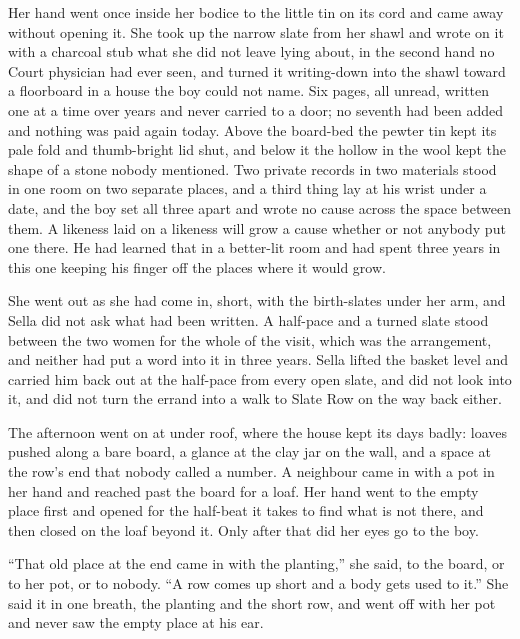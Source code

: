 Her hand went once inside her bodice to the little tin on its cord and came away without opening it. She took up the narrow slate from her shawl and wrote on it with a charcoal stub what she did not leave lying about, in the second hand no Court physician had ever seen, and turned it writing-down into the shawl toward a floorboard in a house the boy could not name. Six pages, all unread, written one at a time over years and never carried to a door; no seventh had been added and nothing was paid again today. Above the board-bed the pewter tin kept its pale fold and thumb-bright lid shut, and below it the hollow in the wool kept the shape of a stone nobody mentioned. Two private records in two materials stood in one room on two separate places, and a third thing lay at his wrist under a date, and the boy set all three apart and wrote no cause across the space between them. A likeness laid on a likeness will grow a cause whether or not anybody put one there. He had learned that in a better-lit room and had spent three years in this one keeping his finger off the places where it would grow.

She went out as she had come in, short, with the birth-slates under her arm, and Sella did not ask what had been written. A half-pace and a turned slate stood between the two women for the whole of the visit, which was the arrangement, and neither had put a word into it in three years. Sella lifted the basket level and carried him back out at the half-pace from every open slate, and did not look into it, and did not turn the errand into a walk to Slate Row on the way back either.

\scenebreak

The afternoon went on at  under  roof, where the house kept its days badly: loaves pushed along a bare board, a glance at the clay jar on the wall, and a space at the row's end that nobody called a number. A neighbour came in with a pot in her hand and reached past the board for a loaf. Her hand went to the empty place first and opened for the half-beat it takes to find what is not there, and then closed on the loaf beyond it. Only after that did her eyes go to the boy.

“That old place at the end came in with the planting,” she said, to the board, or to her pot, or to nobody. “A row comes up short and a body gets used to it.” She said it in one breath, the planting and the short row, and went off with her pot and never saw the empty place at his ear.

